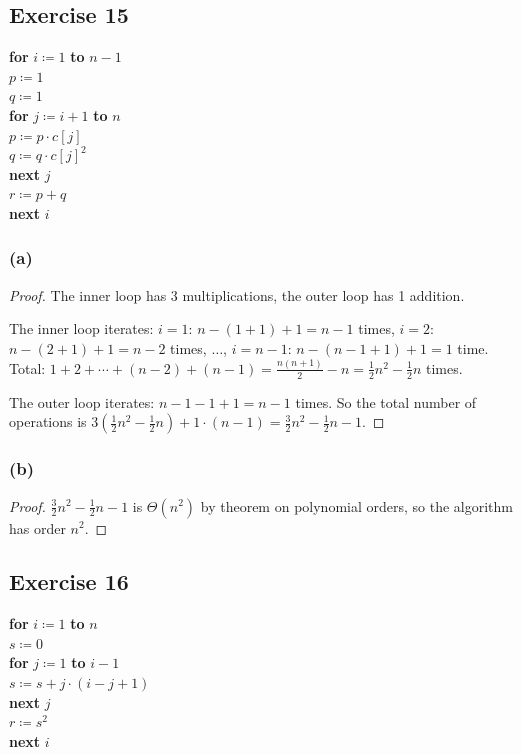 \documentclass[14pt]{extarticle}
\begin{document}
\subsection{Exercise 15}
\begin{tabbing}
    {\bf for} \= \(i \coloneqq 1\) {\bf to} \(n-1\) \\
    \> \(p \coloneqq 1\) \\
    \> \(q \coloneqq 1\) \\
    \> {\bf for} \= \(j \coloneqq i+1\) {\bf to} \(n\)\\
    \>           \> \(p \coloneqq p \cdot c[j]\) \\
    \>           \> \(q \coloneqq q \cdot c[j]^2\) \\
    \> {\bf next} \(j\) \\
    \> \(r \coloneqq p + q\) \\
    {\bf next} \(i\)
\end{tabbing}

\subsubsection{(a)}
\begin{proof}
    The inner loop has 3 multiplications, the outer loop has 1 addition.

    The inner loop iterates: \(i=1\): \(n-(1+1)+1 = n-1\) times, \(i=2\): \(n-(2+1)+1 = n-2\) times, \(\ldots\), \(i = n-1\):
    \(n-(n-1+1)+1 = 1\) time. Total: \(1+2+\cdots+(n-2)+(n-1) = \frac{n(n+1)}{2}-n = \frac{1}{2}n^2 - \frac{1}{2}n\) times.

    The outer loop iterates: \(n-1-1+1 = n-1\) times. So the total number of operations is \(3\left(\frac{1}{2}n^2-\frac{1}{2}
    n\right) + 1 \cdot (n-1) = \frac{3}{2}n^2 - \frac{1}{2}n -1\).
\end{proof}

\subsubsection{(b)}
\begin{proof}
    \(\frac{3}{2}n^2 - \frac{1}{2}n - 1\) is \(\Theta(n^2)\) by theorem on polynomial orders, so the algorithm has order
    \(n^2\).
\end{proof}

\subsection{Exercise 16}
\begin{tabbing}
    {\bf for} \= \(i \coloneqq 1\) {\bf to} \(n\) \\
    \> \(s \coloneqq 0\) \\
    \> {\bf for} \= \(j \coloneqq 1\) {\bf to} \(i-1\)\\
    \>           \> \(s \coloneqq s + j\cdot (i-j+1)\)\\
    \> {\bf next} \(j\) \\
    \> \(r \coloneqq s^2\) \\
    {\bf next} \(i\)
\end{tabbing}
\end{document}
